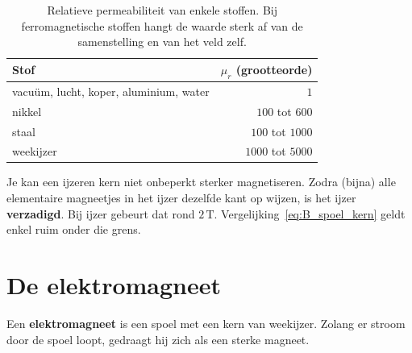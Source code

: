 \documentclass{ximera}
\begin{document}
\begin{table}[ht!]
    \begin{center}
        \begin{tabular}{l r}
            \toprule
            Stof & $\mu_r$ (grootteorde) \\
            \midrule
            vacuüm, lucht, koper, aluminium, water & $1$ \\
            nikkel & $100$ tot $600$ \\
            staal & $100$ tot $1000$ \\
            weekijzer & $1000$ tot $5000$ \\
            \bottomrule
        \end{tabular}
    \end{center}
    \caption{Relatieve permeabiliteit van enkele stoffen. Bij ferromagnetische stoffen hangt de waarde sterk af van de samenstelling en van het veld zelf.}
    \label{tab:mu_r}
\end{table}

\begin{remark}[expandable=true,title={Een ijzeren kern raakt verzadigd}]\nl
    Je kan een ijzeren kern niet onbeperkt sterker magnetiseren. Zodra (bijna) alle elementaire magneetjes in het ijzer dezelfde kant op wijzen, is het ijzer \textbf{verzadigd}. Bij ijzer gebeurt dat rond $2\,\mathrm{T}$. Vergelijking~\eqref{eq:B_spoel_kern} geldt enkel ruim onder die grens.
\end{remark}

\section{De elektromagneet}\label{sec:elektromagneet-toestel}
\begin{definition}[foldable=true,title={Elektromagneet}]\nl
    Een \textbf{elektromagneet} is een spoel met een kern van weekijzer. Zolang er stroom door de spoel loopt, gedraagt hij zich als een sterke magneet.
\end{definition}
\end{document}
